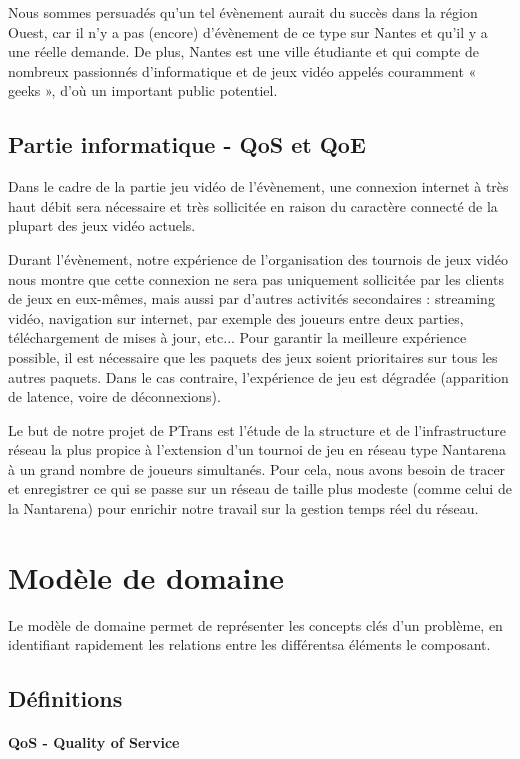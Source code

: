 \documentclass[french]{article}
\begin{document}
Nous sommes persuadés qu'un tel évènement aurait du succès dans la région Ouest, car il n'y a pas (encore) d'évènement de ce type sur Nantes et qu'il y a une réelle demande. De plus, Nantes est une ville étudiante et qui compte de nombreux passionnés d'informatique et de jeux vidéo appelés couramment « geeks », d'où un important public potentiel.

\subsection{Partie informatique - QoS et QoE}

Dans le cadre de la partie jeu vidéo de l'évènement, une connexion internet à très haut débit sera nécessaire et très sollicitée en raison du caractère connecté de la plupart des jeux vidéo actuels.

Durant l'évènement, notre expérience de l'organisation des tournois de jeux vidéo nous montre que cette connexion ne sera pas uniquement sollicitée par les clients de jeux en eux-mêmes, mais aussi par d'autres activités secondaires : streaming vidéo, navigation sur internet, par exemple des joueurs entre deux parties, téléchargement de mises à jour, etc...
Pour garantir la meilleure expérience possible, il est nécessaire que les paquets des jeux soient prioritaires sur tous les autres paquets. Dans le cas contraire, l'expérience de jeu est dégradée (apparition de latence, voire de déconnexions).

Le but de notre projet de PTrans est l'étude de la structure et de l'infrastructure réseau la plus propice à l'extension d'un tournoi de jeu en réseau type Nantarena à un grand nombre de joueurs simultanés.
Pour cela, nous avons besoin de tracer et enregistrer ce qui se passe sur un réseau de taille plus modeste (comme celui de la Nantarena) pour enrichir notre travail sur la gestion temps réel du réseau.

\section{Modèle de domaine}

Le modèle de domaine permet de représenter les concepts clés d'un problème, en identifiant rapidement les relations entre les différentsa éléments le composant.

\subsection{Définitions}
\paragraph{QoS - Quality of Service}
\end{document}

